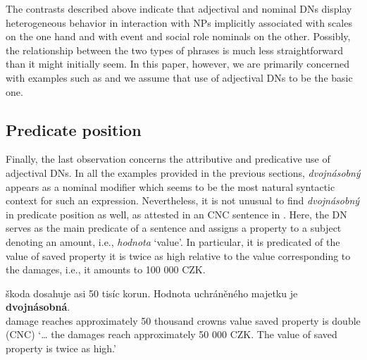 \documentclass[output=paper,
modfonts,
hidelinks,
newtxmath
]{langscibook}
\begin{document}
\ea\label{dvojnasobny-asymmetry} 
\z \z

\noindent The contrasts described above indicate that adjectival and nominal DNs display heterogeneous behavior in interaction with NPs implicitly associated with scales on the one hand and with event and social role nominals on the other. Possibly, the relationship between the two types of phrases is much less straightforward than it might initially seem. In this paper, however, we are primarily concerned with examples such as  and we assume that use of adjectival DNs to be the basic one.

\subsection{Predicate position}\label{predicate-position}

Finally, the last observation concerns the attributive and predicative use of adjectival DNs. In all the examples provided in the previous sections, \textit{dvojnásobný} appears as a nominal modifier which seems to be the most natural syntactic context for such an expression. Nevertheless, it is not unusual to find \textit{dvojnásobný} in predicate position as well, as attested in an CNC sentence in . Here, the DN serves as the main predicate of a sentence and assigns a property to a subject denoting an amount, i.e., \textit{hodnota} `value'. In particular, it is predicated of the value of saved property it is twice as high relative to the value corresponding to the damages, i.e., it amounts to {100 000 CZK}.

\ea \gll {\dots} škoda dosahuje asi 50 tisíc korun. Hodnota uchráněného majetku je \textbf{dvojnásobná}.\label{dvojnasobny-predicate}\\
{} damage reaches approximately 50 thousand crowns value saved property is double\\\hfill(CNC)
\glt `{\dots} the damages reach approximately 50 000 CZK. The value of saved property is twice as high.'
\z
\end{document}
